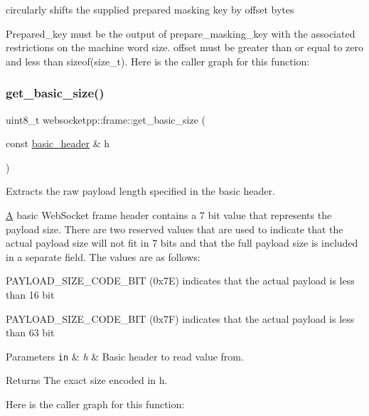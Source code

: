 circularly shifts the supplied prepared masking key by offset bytes 

Prepared\+\_\+key must be the output of prepare\+\_\+masking\+\_\+key with the associated restrictions on the machine word size. offset must be greater than or equal to zero and less than sizeof(size\+\_\+t). Here is the caller graph for this function\+:
\mbox{\label{namespacewebsocketpp_1_1frame_a2ceb63e6a2fe19964d13363ba2bb9e15}} 
\subsubsection{\texorpdfstring{get\+\_\+basic\+\_\+size()}{get\_basic\_size()}}
{\footnotesize\ttfamily uint8\+\_\+t websocketpp\+::frame\+::get\+\_\+basic\+\_\+size (\begin{DoxyParamCaption}\item[{const \mbox{\hyperlink{structwebsocketpp_1_1frame_1_1basic__header}{basic\+\_\+header}} \&}]{h }\end{DoxyParamCaption})\hspace{0.3cm}{\ttfamily [inline]}}



Extracts the raw payload length specified in the basic header. 

\mbox{\hyperlink{struct_a}{A}} basic Web\+Socket frame header contains a 7 bit value that represents the payload size. There are two reserved values that are used to indicate that the actual payload size will not fit in 7 bits and that the full payload size is included in a separate field. The values are as follows\+:

P\+A\+Y\+L\+O\+A\+D\+\_\+\+S\+I\+Z\+E\+\_\+\+C\+O\+D\+E\+\_\+B\+IT (0x7E) indicates that the actual payload is less than 16 bit

P\+A\+Y\+L\+O\+A\+D\+\_\+\+S\+I\+Z\+E\+\_\+\+C\+O\+D\+E\+\_\+B\+IT (0x7F) indicates that the actual payload is less than 63 bit


\begin{DoxyParams}[1]{Parameters}
\mbox{\tt in}  & {\em h} & Basic header to read value from. \\
\hline
\end{DoxyParams}
\begin{DoxyReturn}{Returns}
The exact size encoded in h. 
\end{DoxyReturn}
Here is the caller graph for this function\+:
\mbox{\label{namespacewebsocketpp_1_1frame_a5ae0cc87ac44bb78c5dc41983c43a0c4}} 

